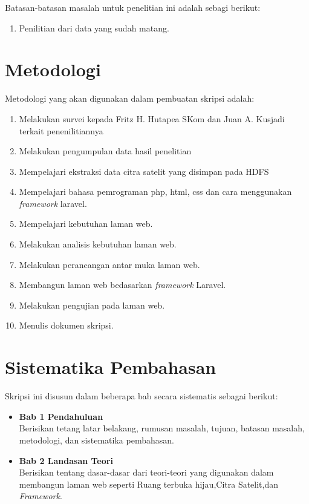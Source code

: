 Batasan-batasan masalah untuk penelitian ini adalah sebagi berikut:
\begin{enumerate}
	\item Penilitian dari data yang sudah matang.
\end{enumerate}


\section{Metodologi}
\label{sec:metlit}
Metodologi yang akan digunakan dalam pembuatan skripsi adalah:
\begin{enumerate}
	\item Melakukan survei kepada Fritz H. Hutapea SKom dan Juan A. Kusjadi terkait penenilitiannya
	\item Melakukan pengumpulan data hasil penelitian
	\item Mempelajari ekstraksi data citra satelit yang disimpan pada HDFS
	\item Mempelajari bahasa pemrograman php, html, css dan cara menggunakan \emph{framework} laravel.
	\item Mempelajari kebutuhan laman web.
	\item Melakukan analisis kebutuhan laman web.
	\item Melakukan perancangan antar muka laman web.
	\item Membangun laman web bedasarkan \emph{framework} Laravel.
	\item Melakukan pengujian pada laman web.
	\item Menulis dokumen skripsi.
\end{enumerate}


\section{Sistematika Pembahasan}
\label{sec:sispem}

Skripsi ini disusun dalam beberapa bab secara sistematis sebagai berikut:
\begin{itemize}
	\item \textbf{Bab 1 Pendahuluan} \\ 
	Berisikan tetang latar belakang, rumusan masalah, tujuan, batasan masalah, metodologi, dan sistematika pembahasan.
	\item \textbf{Bab 2 Landasan Teori} \\ 
	Berisikan tentang dasar-dasar dari teori-teori yang digunakan dalam membangun laman web seperti Ruang terbuka hijau,Citra Satelit,dan \textit{Framework}.
	
\end{itemize}
